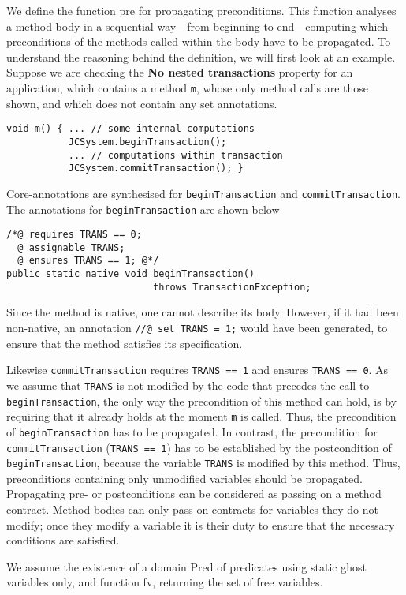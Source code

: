 We define the function \textsf{pre} for
propagating preconditions. This function analyses a
method body in a sequential way---from beginning to end---computing
which preconditions of the methods called within the body have to be
propagated. To understand the reasoning behind the definition, we will
first look at an example. Suppose we are checking the \textbf{No
nested transactions} property for an application, which contains a
method \texttt{m}, whose only method calls are those shown, and which
does not contain any set annotations.
\begin{verbatim}
void m() { ... // some internal computations
           JCSystem.beginTransaction();
           ... // computations within transaction
           JCSystem.commitTransaction(); }
\end{verbatim}
Core-annotations are synthesised for \texttt{beginTransaction}
and \texttt{commit\-Transaction}. The annotations for
\texttt{beginTransaction} are shown below
\begin{verbatim}
/*@ requires TRANS == 0;
  @ assignable TRANS;
  @ ensures TRANS == 1; @*/
public static native void beginTransaction() 
                          throws TransactionException;
\end{verbatim}
Since the method is native, one cannot describe its body. However, if
it had been non-native, an annotation \texttt{//@ set TRANS = 1;}
would have been generated, to ensure that the method satisfies its
specification.

Likewise \texttt{commitTransaction} requires \texttt{TRANS == 1}
and ensures \texttt{TRANS == 0}. As we assume that \texttt{TRANS} is
not modified by the code that precedes the call to
\texttt{beginTransaction},  the only way the precondition of this method
can hold, is by requiring that it already holds at the moment
\texttt{m} is called. Thus, the precondition of
\texttt{beginTransaction} has to be propagated. In contrast, the
precondition for \texttt{commitTransaction} (\texttt{TRANS == 1})
has to be established by the postcondition of
\texttt{begin\-Transaction}, because the variable \texttt{TRANS} is
modified by this method. 
Thus, preconditions containing only unmodified variables should be
propagated.  Propagating pre- or postconditions can be considered as
passing on a method contract. Method bodies can only pass on contracts
for variables they do not modify; once they modify a variable it is
their duty to ensure that the necessary conditions are satisfied.

We assume the existence of a domain \textsf{Pred} of predicates using
static ghost variables only, and function
\textsf{fv}, returning the set of free variables.

